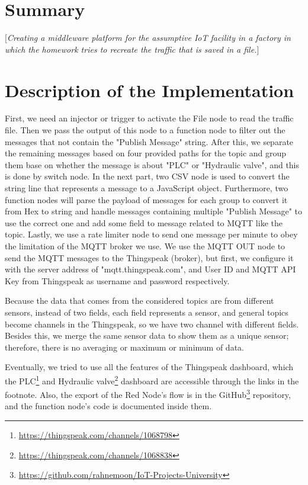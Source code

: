 \documentclass[10pt,english, openany]{book}
\begin{document}
\chapter{Summary}\label{chapt:sum}
[\textit{Creating a middleware platform for the assumptive IoT facility in a factory in which the homework tries to recreate the traffic that is saved in a file.}]
\chapter{Description of the Implementation}
First, we need an injector or trigger to activate the File node to read the traffic file. Then we pass the output of this node to a function node to filter out the messages that not contain the "Publish Message" string. After this, we separate the remaining messages based on four provided paths for the topic and group them base on whether the message is about "PLC" or "Hydraulic valve", and this is done by switch node. 
In the next part, two CSV node is used to convert the string line that represents a message to a JavaScript object. Furthermore, two function nodes will parse the payload of messages for each group to convert it from Hex to string and handle messages containing multiple "Publish Message" to use the correct one and add some field to message related to MQTT like the topic.
Lastly, we use a rate limiter node to send one message per minute to obey the limitation of the MQTT broker we use.  We use the MQTT OUT node to send the MQTT messages to the Thingspeak (broker), but first, we configure it with the server address of "mqtt.thingspeak.com", and User ID and MQTT API Key from Thingspeak as username and password respectively.\par

Because the data that comes from the considered topics are from different sensors, instead of two fields, each field represents a sensor, and general topics become channels in the Thingspeak, so we have two channel with different fields. Besides this, we merge the same sensor data to show them as a unique sensor; therefore, there is no averaging or maximum or minimum of data.\par

Eventually, we tried to use all the features of the Thingspeak dashboard, which the PLC\footnote{\url{https://thingspeak.com/channels/1068798}} and Hydraulic valve\footnote{\url{https://thingspeak.com/channels/1068838}} dashboard are accessible through the links in the footnote. Also, the export of the Red Node's flow is in the GitHub\footnote{\url{https://github.com/rahnemoon/IoT-Projects-University}} repository, and the function node's code is documented inside them.
\end{document}
